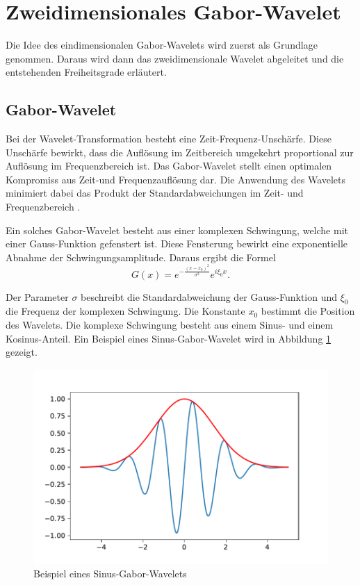 \section{Zweidimensionales Gabor-Wavelet}

Die Idee des eindimensionalen Gabor-Wavelets wird zuerst als Grundlage genommen. 
Daraus wird dann das zweidimensionale Wavelet abgeleitet und die entstehenden Freiheitsgrade erläutert.

\subsection{Gabor-Wavelet}

Bei der Wavelet-Transformation besteht eine Zeit-Frequenz-Unschärfe.
Diese Unschärfe bewirkt, dass die Auflösung im Zeitbereich umgekehrt proportional zur Auflösung im Frequenzbereich ist.
Das Gabor-Wavelet stellt einen optimalen Kompromiss aus Zeit-und Frequenzauflösung dar.
Die Anwendung des Wavelets minimiert dabei das Produkt der Standardabweichungen im Zeit- und Frequenzbereich \cite{paper:communication}.

Ein solches Gabor-Wavelet besteht aus einer komplexen Schwingung, welche mit einer Gauss-Funktion gefenstert ist.
Diese Fensterung bewirkt eine exponentielle Abnahme der Schwingungsamplitude.
Daraus ergibt die Formel
\begin{equation}\label{eq:1d_gabor}
G(x)= e^{-\frac{(x-x_{0})^{2}}{\sigma^{2}}} e^{i\xi_{0}x}.
\end{equation}

Der Parameter $\sigma$ beschreibt die Standardabweichung der Gauss-Funktion und $\xi_{0}$ die Frequenz der komplexen Schwingung. 
Die Konstante $x_0$ bestimmt die Position des Wavelets.
Die komplexe Schwingung besteht aus einem Sinus- und einem  Kosinus-Anteil. 
Ein Beispiel eines Sinus-Gabor-Wavelet wird in Abbildung \ref{fig:gabor1d} gezeigt.

\begin{figure}
	\centering
	\includegraphics[width=0.7\linewidth]{./papers/visuell/images/gabor_1d}
	\caption{Beispiel eines Sinus-Gabor-Wavelets}
	\label{fig:gabor1d}
\end{figure}


